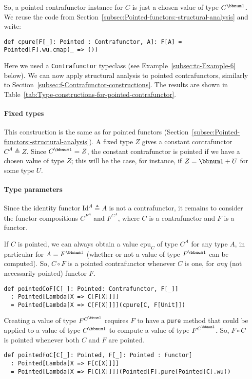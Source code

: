 So, a pointed contrafunctor instance for $C$ is just a chosen value
of type $C^{\bbnum 1}$. We reuse the code from Section~\ref{subsec:Pointed-functors:-structural-analysis}
and write:
\begin{lstlisting}
def cpure[F[_]: Pointed : Contrafunctor, A]: F[A] = Pointed[F].wu.cmap(_ => ())
\end{lstlisting}
Here we used a \lstinline!Contrafunctor! typeclass (see Example~\ref{subsec:tc-Example-6}
below). We can now apply structural analysis to pointed contrafunctors,
similarly to Section~\ref{subsec:f-Contrafunctor-constructions}.
The results are shown in Table~\ref{tab:Type-constructions-for-pointed-contrafunctor}.

\paragraph{Fixed types}

This construction is the same as for pointed functors (Section~\ref{subsec:Pointed-functors:-structural-analysis}).
A fixed type $Z$ gives a constant contrafunctor $C^{A}\triangleq Z$.
Since $C^{\bbnum 1}=Z$, the constant contrafunctor is pointed if
we have a chosen value of type $Z$; this will be the case, for instance,
if $Z=\bbnum 1+U$ for some type $U$. 

\paragraph{Type parameters}

Since the identity functor $\text{Id}^{A}\triangleq A$ is not a contrafunctor,
it remains to consider the functor compositions $C^{F^{A}}$ and $F^{C^{A}}$,
where $C$ is a contrafunctor and $F$ is a functor. 

If $C$ is pointed, we can always obtain a value $\text{cpu}_{C}$
of type $C^{A}$ for any type $A$, in particular for $A=F^{\bbnum 1}$
(whether or not a value of type $F^{\bbnum 1}$ can be computed).
So, $C\circ F$ is a pointed contrafunctor whenever $C$ is one, for
\emph{any} (not necessarily pointed) functor $F$.
\begin{lstlisting}
def pointedCoF[C[_]: Pointed: Contrafunctor, F[_]]
  : Pointed[Lambda[X => C[F[X]]]]
  = Pointed[Lambda[X => C[F[X]]]](cpure[C, F[Unit]])
\end{lstlisting}

Creating a value of type $F^{C^{\bbnum 1}}$ requires $F$ to have
a \lstinline!pure! method that could be applied to a value of type
$C^{\bbnum 1}$ to compute a value of type $F^{C^{\bbnum 1}}$. So,
$F\circ C$ is pointed whenever both $C$ and $F$ are pointed.
\begin{lstlisting}
def pointedFoC[C[_]: Pointed, F[_]: Pointed : Functor]
  : Pointed[Lambda[X => F[C[X]]]]
  = Pointed[Lambda[X => F[C[X]]]](Pointed[F].pure(Pointed[C].wu))
\end{lstlisting}


